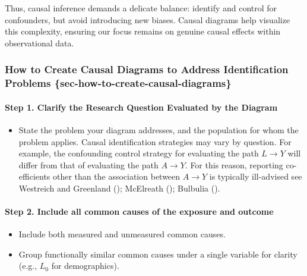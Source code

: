 \documentclass[
  singlecolumn]{article}
\let\oldparagraph\paragraph
\renewcommand{\paragraph}[1]{\oldparagraph{#1}\mbox{}}
\providecommand{\tightlist}{%
  \setlength{\itemsep}{0pt}\setlength{\parskip}{0pt}}\usepackage{longtable,booktabs,array}
\begin{document}
Thus, causal inference demands a delicate balance: identify and control
for confounders, but avoid introducing new biases. Causal diagrams help
visualize this complexity, ensuring our focus remains on genuine causal
effects within observational data.

\subsubsection{How to Create Causal Diagrams to Address Identification
Problems
\{sec-how-to-create-causal-diagrams\}}\label{how-to-create-causal-diagrams-to-address-identification-problems-sec-how-to-create-causal-diagrams}

\paragraph{Step 1. Clarify the Research Question Evaluated by the
Diagram}\label{step-1.-clarify-the-research-question-evaluated-by-the-diagram}

\begin{itemize}
\tightlist
\item
  State the problem your diagram addresses, and the population for whom
  the problem applies. Causal identification strategies may vary by
  question. For example, the confounding control strategy for evaluating
  the path \(L\to Y\) will differ from that of evaluating the path
  \(A\to Y\). For this reason, reporting co-efficients other than the
  association between \(A \to Y\) is typically ill-advised see Westreich
  and Greenland (); McElreath
  (); Bulbulia
  ().
\end{itemize}

\paragraph{Step 2. Include all common causes of the exposure and
outcome}\label{step-2.-include-all-common-causes-of-the-exposure-and-outcome}

\begin{itemize}
\tightlist
\item
  Include both measured and unmeasured common causes.
\item
  Group functionally similar common causes under a single variable for
  clarity (e.g., \(L_0\) for demographics).
\end{itemize}
\end{document}
